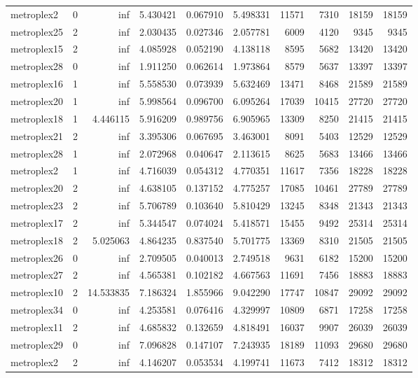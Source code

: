 \begin{longtable}{|l|r|r|r|r|r|r|r|r|r|}
metroplex2 & 0 & inf & 5.430421 & 0.067910 & 5.498331 & 11571 & 7310 & 18159 & 18159 \\
metroplex25 & 2 & inf & 2.030435 & 0.027346 & 2.057781 & 6009 & 4120 & 9345 & 9345 \\
metroplex15 & 2 & inf & 4.085928 & 0.052190 & 4.138118 & 8595 & 5682 & 13420 & 13420 \\
metroplex28 & 0 & inf & 1.911250 & 0.062614 & 1.973864 & 8579 & 5637 & 13397 & 13397 \\
metroplex16 & 1 & inf & 5.558530 & 0.073939 & 5.632469 & 13471 & 8468 & 21589 & 21589 \\
metroplex20 & 1 & inf & 5.998564 & 0.096700 & 6.095264 & 17039 & 10415 & 27720 & 27720 \\
metroplex18 & 1 & 4.446115 & 5.916209 & 0.989756 & 6.905965 & 13309 & 8250 & 21415 & 21415 \\
metroplex21 & 2 & inf & 3.395306 & 0.067695 & 3.463001 & 8091 & 5403 & 12529 & 12529 \\
metroplex28 & 1 & inf & 2.072968 & 0.040647 & 2.113615 & 8625 & 5683 & 13466 & 13466 \\
metroplex2 & 1 & inf & 4.716039 & 0.054312 & 4.770351 & 11617 & 7356 & 18228 & 18228 \\
metroplex20 & 2 & inf & 4.638105 & 0.137152 & 4.775257 & 17085 & 10461 & 27789 & 27789 \\
metroplex23 & 2 & inf & 5.706789 & 0.103640 & 5.810429 & 13245 & 8348 & 21343 & 21343 \\
metroplex17 & 2 & inf & 5.344547 & 0.074024 & 5.418571 & 15455 & 9492 & 25314 & 25314 \\
metroplex18 & 2 & 5.025063 & 4.864235 & 0.837540 & 5.701775 & 13369 & 8310 & 21505 & 21505 \\
metroplex26 & 0 & inf & 2.709505 & 0.040013 & 2.749518 & 9631 & 6182 & 15200 & 15200 \\
metroplex27 & 2 & inf & 4.565381 & 0.102182 & 4.667563 & 11691 & 7456 & 18883 & 18883 \\
metroplex10 & 2 & 14.533835 & 7.186324 & 1.855966 & 9.042290 & 17747 & 10847 & 29092 & 29092 \\
metroplex34 & 0 & inf & 4.253581 & 0.076416 & 4.329997 & 10809 & 6871 & 17258 & 17258 \\
metroplex11 & 2 & inf & 4.685832 & 0.132659 & 4.818491 & 16037 & 9907 & 26039 & 26039 \\
metroplex29 & 0 & inf & 7.096828 & 0.147107 & 7.243935 & 18189 & 11093 & 29680 & 29680 \\
metroplex2 & 2 & inf & 4.146207 & 0.053534 & 4.199741 & 11673 & 7412 & 18312 & 18312 \\

\end{longtable}
